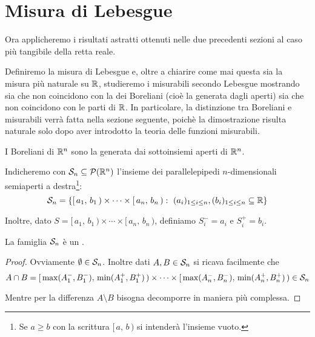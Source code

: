 \section{Misura di Lebesgue}
Ora applicheremo i risultati astratti ottenuti nelle due precedenti sezioni al caso più tangibile della retta reale.

Definiremo la misura di Lebesgue e, oltre a chiarire come mai questa sia la misura più naturale su $\R$, studieremo i misurabili secondo Lebesgue mostrando sia che non coincidono con la \sigalg{} dei Boreliani (cioè la \sigalg{} generata dagli aperti) sia che non coincidono con le parti di $\R$.
In particolare, la distinzione tra Boreliani e misurabili verrà fatta nella sezione seguente, poichè la dimostrazione risulta naturale solo dopo aver introdotto la teoria delle funzioni misurabili.

\begin{definition}
	I Boreliani di $\R^n$ sono la \sigalg{} generata dai sottoinsiemi aperti di $\R^n$.
\end{definition}

\newcommand{\so}[2]{\ensuremath{[\,#1,\,#2\,)}}
\newcommand{\oo}[2]{\ensuremath{(\,#1,\,#2\,)}}
\newcommand{\cc}[2]{\ensuremath{[\,#1,\,#2\,]}}

\begin{definition}
	Indicheremo con $\S_n\subseteq\mathcal P(\R^n)$ l'insieme dei parallelepipedi $n$-dimensionali semiaperti a destra\footnote{Se $a\ge b$ con la scrittura $\so{a}{b}$ si intenderà l'insieme vuoto.}:
	\begin{equation*}
		\S_n=\left\{\so{a_1}{b_1}\times\cdots\times\so{a_n}{b_n}:\ (a_i)_{1\le i\le n},(b_i)_{1\le i\le n}\subseteq \R\right\}
	\end{equation*}
	
	Inoltre, dato $S=\so{a_1}{b_1}\times\cdots\times\so{a_n}{b_n}$, definiamo $S^-_i=a_i$ e $S^+_i=b_i$.
\end{definition}

\begin{lemma}
	La famiglia $\S_n$ è un \semiring{}.
\end{lemma}
\begin{proof}
	Ovviamente $\emptyset\in\S_n$.
	Inoltre dati $A,B\in\S_n$ si ricava facilmente che
	\begin{equation*}
		A\cap B=\so{\max(A^-_1,B^-_1)}{\min(A^+_1,B^+_1)}\times\cdots\times\so{\max(A^-_n,B^-_n)}{\min(A^+_n,B^+_n)}\in\S_n
	\end{equation*}

	Mentre per la differenza $A\setminus B$ bisogna decomporre in maniera più complessa.
\end{proof}


